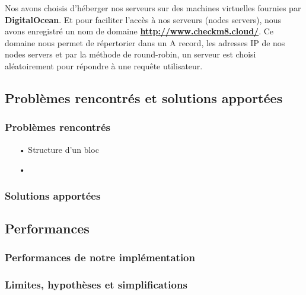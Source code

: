 \documentclass[journal, a4paper]{IEEEtran}
\begin{document}
				Nos avons choisis d'héberger nos serveurs sur des machines virtuelles fournies par \textbf{DigitalOcean}.
			Et pour faciliter l'accès à nos serveurs (nodes servers), nous avons enregistré un nom de domaine \textbf{\url{http://www.checkm8.cloud/}}.
			Ce domaine nous permet de répertorier dans un A record, les adresses IP de nos nodes servers et par la méthode de round-robin,
			un serveur est choisi aléatoirement pour répondre à une requête utilisateur.

	\subsection{Problèmes rencontrés et solutions apportées}\label{subsec:problèmes-rencontrés-et-solutions-apportées}
		\begin{center}
			\subsubsection*{\textbf{Problèmes rencontrés}}\label{subsubsec:problèmes-rencontrés}
		\end{center}

		\begin{itemize}
			\item[•] Structure d'un bloc
			\item[•]
		\end{itemize}

		\begin{center}
			\subsubsection*{\textbf{Solutions apportées}}\label{subsubsec:solutions-apportées}
		\end{center}

	\subsection{Performances}\label{subsec:performances}
		\begin{center}
			\subsubsection*{\textbf{Performances de notre implémentation}}\label{subsubsec:performances-de-notre-implémentation}
		\end{center}

		\begin{center}
			\subsubsection*{\textbf{Limites, hypothèses et simplifications}}\label{subsubsec:limites,-hypothèses-et-simplifications}
		\end{center}
\end{document}
